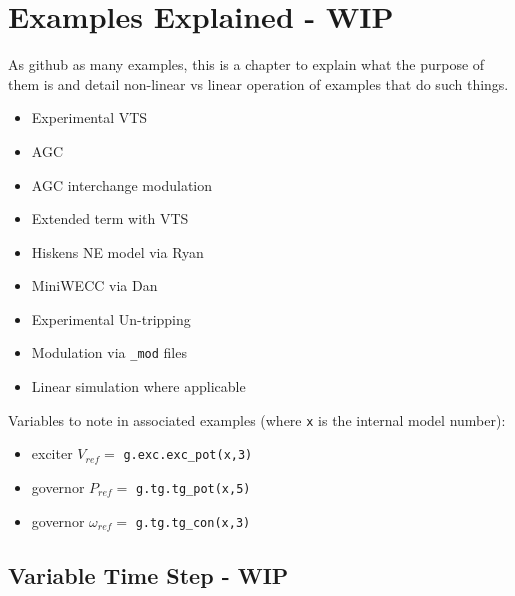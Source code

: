 \chapter{Examples Explained - WIP}
As github as many examples, this is a chapter to explain what the purpose of them is and detail non-linear vs linear operation of examples that do such things.

\begin{itemize}
\item Experimental VTS
\item AGC
\item AGC interchange modulation
\item Extended term with VTS
\item Hiskens NE model via Ryan
\item MiniWECC via Dan
\item Experimental Un-tripping
\item Modulation via \verb|_mod| files
\item Linear simulation where applicable
\end{itemize}

Variables to note in associated examples (where \verb|x| is the internal model number):
\begin{itemize}
\item exciter $V_{ref} = $ \verb|g.exc.exc_pot(x,3)|
\item governor $P_{ref} = $ \verb|g.tg.tg_pot(x,5)|
\item governor $\omega_{ref} = $ \verb|g.tg.tg_con(x,3)|
\end{itemize}


\section{Variable Time Step - WIP}